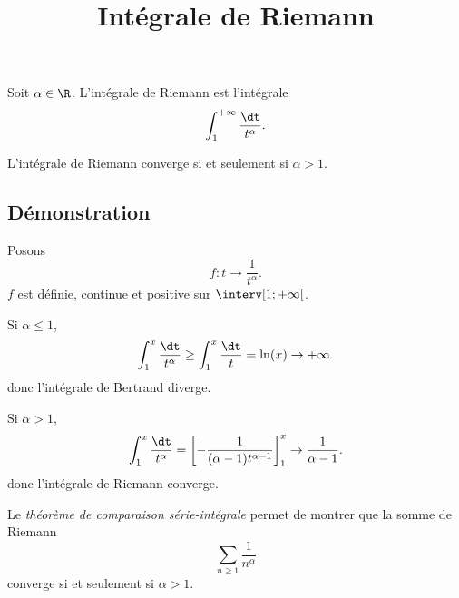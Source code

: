 \documentclass[fontsize=12pt,twoside=false,parskip=half]{scrartcl}
\title{Intégrale de Riemann}
\date{}
\author{}
\begin{document}
\maketitle
    Soit $\alpha \in \R$. L’intégrale de Riemann est l’intégrale
   \[
      \int_1^{+\infty} \frac{\dt}{t^\alpha}.
   \]
   \begin{Theoreme}
      L’intégrale de Riemann converge si et seulement si $\alpha > 1$.
   \end{Theoreme}
   \subsection{Démonstration}
      Posons
      \[
         f \colon t \to \frac{1}{t^\alpha}.
      \]
      $f$ est définie, continue et positive sur $\interv[1 ; +\infty[$.
      
      Si $\alpha \leq 1$,
      \[
         \int_1^{x} \frac{\dt}{t^\alpha} \geq \int_1^{x} \frac{\dt}{t} = \ln(x) \to +\infty.
      \]
      donc l’intégrale de Bertrand diverge.
      
      Si $\alpha > 1$,
      \[
         \int_1^{x} \frac{\dt}{t^\alpha} = \left[-\frac{1}{(\alpha - 1) t^{\alpha - 1}}\right]_1^x \to \frac{1}{\alpha - 1}.
      \]
      donc l’intégrale de Riemann converge.
   
   \begin{Theoreme}
      Le \emph{théorème de comparaison série-intégrale} permet de montrer que la somme de Riemann 
      \[
         \sum_{n \geq 1} \frac{1}{n^\alpha}
      \]
      converge si et seulement si $\alpha > 1$.
   \end{Theoreme}
\end{document}
